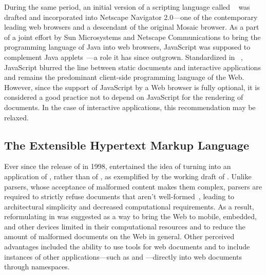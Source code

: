 \begin{figure}
\end{figure}

During the same period, an initial version of a scripting language called
~\cite{ecma97} was drafted and incorporated into Netscape
Navigator 2.0---one of the contemporary leading web browsers and a descendant of the
original Mosaic browser. As a part of a joint effort by Sun Microsystems and
Netscape Communications to bring the programming language of Java into web
browsers, JavaScript was supposed to complement Java
applets~\cite{netscape95}---a role it has since outgrown. Standardized in
\citeyear{ecma97}~\cite{ecma97}, JavaScript blurred the line between static
documents and interactive applications and remains the predominant client-side
programming language of the Web. However, since the support of JavaScript by a
Web browser is fully optional, it is considered a good practice not to depend on
JavaScript for the rendering of  documents. In the case of
interactive  applications, this recommendation may be relaxed.

\subsection{The Extensible Hypertext Markup Language}
Ever since the release of  in 1998,  entertained the
idea of turning  into an application of , rather than
of , as exemplified by the working draft of .
Unlike  parsers, whose acceptance of malformed content makes them
complex,  parsers are required to strictly refuse 
documents that aren't well-formed~\cite[Section~1.2, Terminology]{bray98},
leading to architectural simplicity and decreased computational requirements. As
a result, reformulating  in  was suggested as a way
to bring the Web to mobile, embedded, and other devices limited in their
computational resources and to reduce the amount of malformed documents on the
Web in general. Other perceived advantages included the ability to use
 tools for web documents and to include instances of other
 applications---such as  and
---directly into web documents through  namespaces.

